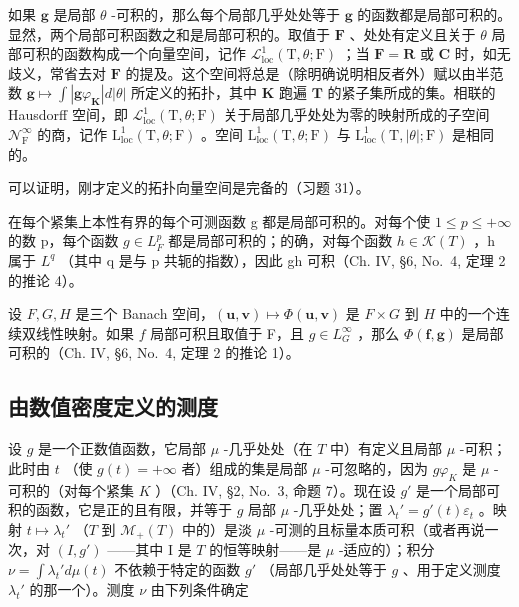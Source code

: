如果 \(\mathbf{g}\) 是局部 \(\theta\) -可积的，那么每个局部几乎处处等于 \(\mathbf{g}\) 的函数都是局部可积的。显然，两个局部可积函数之和是局部可积的。取值于 \(\mathbf{F}\) 、处处有定义且关于 \(\theta\) 局部可积的函数构成一个向量空间，记作 \(\mathcal{L}_{\mathrm{loc}}^{1}(\mathrm{T},\theta ;\mathrm{F})\) ；当 \(\mathbf{F} = \mathbf{R}\) 或 \(\mathbf{C}\) 时，如无歧义，常省去对 \(\mathbf{F}\) 的提及。这个空间将总是（除明确说明相反者外）赋以由半范数 \(\mathbf{g}\mapsto \int |\mathbf{g}\varphi_{\mathbf{K}}|d|\theta |\) 所定义的拓扑，其中 \(\mathbf{K}\) 跑遍 \(\mathbf{T}\) 的紧子集所成的集。相联的 Hausdorff 空间，即 \(\mathcal{L}_{\mathrm{loc}}^{1}(\mathrm{T},\theta ;\mathrm{F})\) 关于局部几乎处处为零的映射所成的子空间 \(\mathcal{N}_{\mathrm{F}}^{\infty}\) 的商，记作 \(\mathrm{L}_{\mathrm{loc}}^{1}(\mathrm{T},\theta ;\mathrm{F})\) 。空间 \(\mathrm{L}_{\mathrm{loc}}^{1}(\mathrm{T},\theta ;\mathrm{F})\) 与 \(\mathrm{L}_{\mathrm{loc}}^{1}(\mathrm{T},|\theta |; \mathrm{F})\) 是相同的。

可以证明，刚才定义的拓扑向量空间是完备的（习题 31）。

在每个紧集上本性有界的每个可测函数 g 都是局部可积的。对每个使 \(1 \leqslant p \leqslant +\infty\) 的数 p，每个函数 \(g \in L_{F}^{p}\) 都是局部可积的；的确，对每个函数 \(h \in \mathcal{K}(T)\) ，h 属于 \(L^{q}\) （其中 q 是与 p 共轭的指数），因此 gh 可积（Ch. IV, §6, No.~4, 定理 2 的推论 4）。

设 \(F, G, H\) 是三个 Banach 空间，\((\mathbf{u}, \mathbf{v}) \mapsto \Phi(\mathbf{u}, \mathbf{v})\) 是 \(F \times G\) 到 \(H\) 中的一个连续双线性映射。如果 \(f\) 局部可积且取值于 F，且 \(g \in L_{G}^{\infty}\) ，那么 \(\Phi(\mathbf{f}, \mathbf{g})\) 是局部可积的（Ch. IV, §6, No.~4, 定理 2 的推论 1）。

\subsection{由数值密度定义的测度}

设 \(g\) 是一个正数值函数，它局部 \(\mu\) -几乎处处（在 \(T\) 中）有定义且局部 \(\mu\) -可积；此时由 \(t\) （使 \(g(t) = +\infty\) 者）组成的集是局部 \(\mu\) -可忽略的，因为 \(g\varphi_{K}\) 是 \(\mu\) -可积的（对每个紧集 \(K\) ）（Ch. IV, §2, No.~3, 命题 7）。现在设 \(g'\) 是一个局部可积的函数，它是正的且有限，并等于 \(g\) 局部 \(\mu\) -几乎处处；置 \(\lambda_t' = g'(t)\varepsilon_t\) 。映射 \(t \mapsto \lambda_t'\) （\(T\) 到 \(\mathcal{M}_+(T)\) 中的）是淡 \(\mu\) -可测的且标量本质可积（或者再说一次，对 \((I,g')\) ——其中 I 是 \(T\) 的恒等映射——是 \(\mu\) -适应的）；积分 \(\nu = \int \lambda_t' d\mu(t)\) 不依赖于特定的函数 \(g'\) （局部几乎处处等于 \(g\) 、用于定义测度 \(\lambda_t'\) 的那一个）。测度 \(\nu\) 由下列条件确定

